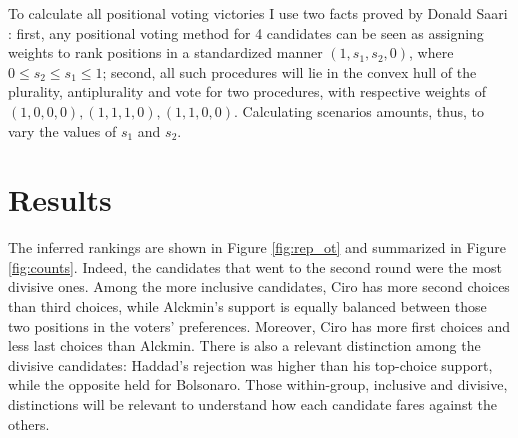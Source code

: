 \documentclass[hidelinks,11pt]{article}
\begin{document}
To calculate all positional voting victories I use two facts proved by Donald
Saari \parencite{saari2012geometry, saari2001chaotic}: first, any positional
voting method for 4 candidates can be seen as assigning weights to rank
positions in a standardized manner \((1,s_{1},s_{2},0)\), where
\(0 \leq s_{2} \leq s_{1} \leq 1\); second, all such procedures will lie in the
convex hull of the plurality, antiplurality and vote for two procedures, with
respective weights of \((1,0,0,0), (1,1,1,0), (1,1,0,0)\). Calculating scenarios
amounts, thus, to vary the values of \(s_{1}\) and \(s_{2}\).


\section{Results}
The inferred rankings are shown in Figure \ref{fig:rep_ot} and summarized in
Figure \ref{fig:counts}. Indeed, the candidates that went to the second round
were the most divisive ones. Among the more inclusive candidates, Ciro has more
second choices than third choices, while Alckmin's support is equally balanced
between those two positions in the voters' preferences. Moreover, Ciro has more
first choices and less last choices than Alckmin. There is also a relevant
distinction among the divisive candidates: Haddad's rejection was higher than
his top-choice support, while the opposite held for Bolsonaro. Those
within-group, inclusive and divisive, distinctions will be relevant to
understand how each candidate fares against the others.
\end{document}
